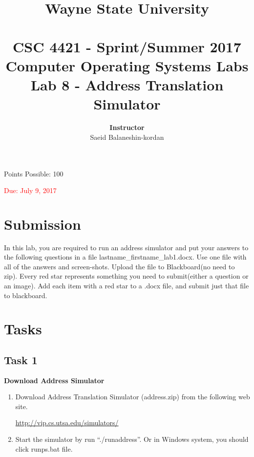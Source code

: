 \documentclass[16pt]{article}
\begin{document}
\title{\huge \textbf{Wayne State University \\
 \vline \\
\Huge CSC 4421 - Sprint/Summer 2017 \\
 Computer Operating Systems Labs\\
 Lab 8 - Address Translation Simulator}\\
 \vline
 }
\author{\textbf{Instructor}  \vspace{0.2cm} \\ 
Saeid Balaneshin-kordan
}
\date{}
\maketitle

\begin{center}
\Large Points Possible: 100 

\textcolor{red}{Due: July 9, 2017}
\end{center}

\section*{Submission}

In this lab, you are required to run an address simulator and put your answers to the following questions in a file lastname\_firstname\_lab1.docx. Use one file with all of the answers and screen-shots. Upload the file to Blackboard(no need to zip). Every red star represents something you need to submit(either a question or an image). Add each item with a red star to a .docx file, and submit just that file to blackboard.



\section*{Tasks}



\subsection*{Task 1}
\textbf{Download Address Simulator}


\begin{enumerate}
\item Download Address Translation Simulator (address.zip) from the following web site.

\url{http://vip.cs.utsa.edu/simulators/}

\item Start the simulator by run ``./runaddress''. Or in Windows system, you should click runps.bat file.

\end{enumerate}
\end{document}
